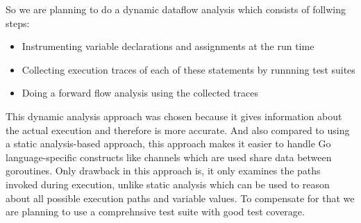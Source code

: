 So we are planning to do a dynamic dataflow analysis which consists of follwing steps:
\begin{itemize}
\item Instrumenting variable declarations and assignments at the run time
\item Collecting execution traces of each of these statements by runnning test suites
\item Doing a forward flow analysis using the collected traces
\end{itemize}

This dynamic analysis approach was chosen because it gives information about the actual execution and therefore is more accurate. And also compared to using a static analysis-based approach, this approach makes it easier to handle Go language-specific constructs like channels which are used share data between goroutines. Only drawback in this approach is, it only examines the paths invoked during execution, unlike static analysis which can be used to reason about all possible execution paths and variable values. To compensate for that we are planning to use a comprehnsive test suite with good test coverage.




